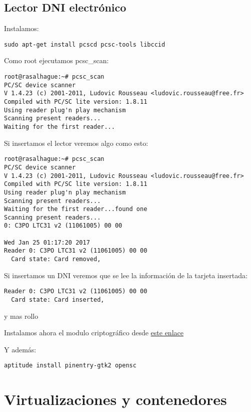 \documentclass[
  12pt,
  spanish,
]{article}
\begin{document}
\hypertarget{lector-dni-electruxf3nico}{%
\subsection{Lector DNI electrónico}\label{lector-dni-electruxf3nico}}

Instalamos:

\begin{verbatim}
sudo apt-get install pcscd pcsc-tools libccid
\end{verbatim}

Como root ejecutamos pcsc\_scan:

\begin{verbatim}
root@rasalhague:~# pcsc_scan 
PC/SC device scanner
V 1.4.23 (c) 2001-2011, Ludovic Rousseau <ludovic.rousseau@free.fr>
Compiled with PC/SC lite version: 1.8.11
Using reader plug'n play mechanism
Scanning present readers...
Waiting for the first reader...
\end{verbatim}

Si insertamos el lector veremos algo como esto:

\begin{verbatim}
root@rasalhague:~# pcsc_scan 
PC/SC device scanner
V 1.4.23 (c) 2001-2011, Ludovic Rousseau <ludovic.rousseau@free.fr>
Compiled with PC/SC lite version: 1.8.11
Using reader plug'n play mechanism
Scanning present readers...
Waiting for the first reader...found one
Scanning present readers...
0: C3PO LTC31 v2 (11061005) 00 00

Wed Jan 25 01:17:20 2017
Reader 0: C3PO LTC31 v2 (11061005) 00 00
  Card state: Card removed,
\end{verbatim}

Si insertamos un DNI veremos que se lee la información de la tarjeta
insertada:

\begin{verbatim}
Reader 0: C3PO LTC31 v2 (11061005) 00 00
  Card state: Card inserted, 
\end{verbatim}

y mas rollo

Instalamos ahora el modulo criptográfico desde
\href{https://www.dnielectronico.es/PortalDNIe/PRF1_Cons02.action?pag=REF_1112}{este
enlace}

Y además:

\begin{verbatim}
aptitude install pinentry-gtk2 opensc
\end{verbatim}

\hypertarget{virtualizaciones-y-contenedores}{%
\section{Virtualizaciones y
contenedores}\label{virtualizaciones-y-contenedores}}
\end{document}
